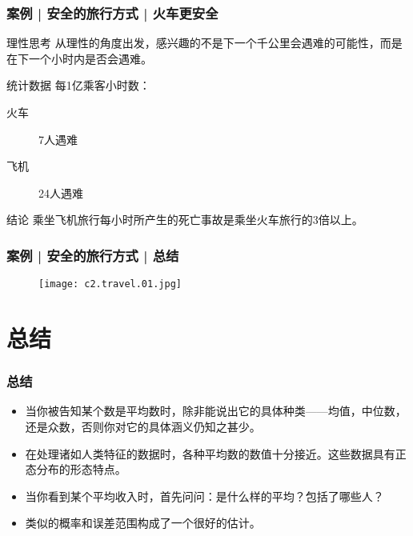 \begin{frame}
  \frametitle{案例 | 安全的旅行方式 | 火车更安全}
  \begin{block}{理性思考}
    从理性的角度出发，感兴趣的不是下一个千公里会遇难的可能性，而是在下一个小时内是否会遇难。
  \end{block}
  \pause
  \begin{block}{统计数据}
    每1亿乘客小时数：
    \begin{description}
      \item[火车] 7人遇难
      \item[飞机] 24人遇难
    \end{description}
  \end{block}
  \pause
  \begin{block}{结论}
    乘坐飞机旅行每小时所产生的死亡事故是乘坐火车旅行的3倍以上。
  \end{block}
\end{frame}

\begin{frame}
  \frametitle{案例 | 安全的旅行方式 | 总结}
  \begin{figure}
    \centering
    \texttt{[image: c2.travel.01.jpg]}
  \end{figure}
\end{frame}

\section{}

\section{总结}
\begin{frame}
  \frametitle{总结}
  \begin{itemize}
    \item 当你被告知某个数是平均数时，除非能说出它的具体种类——均值，中位数，还是众数，否则你对它的具体涵义仍知之甚少。
    \item 在处理诸如人类特征的数据时，各种平均数的数值十分接近。这些数据具有正态分布的形态特点。
    \item 当你看到某个平均收入时，首先问问：是什么样的平均？包括了哪些人？
    \item 类似的概率和误差范围构成了一个很好的估计。
  \end{itemize}
\end{frame}

